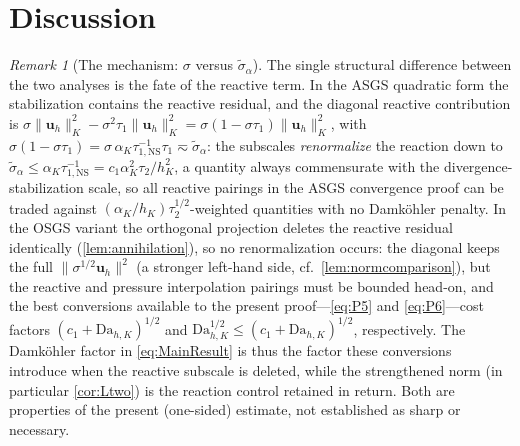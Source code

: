 \documentclass[11pt]{article}
\theoremstyle{remark}
\newtheorem{remark}[theorem]{Remark}
\newcommand{\bu}{\boldsymbol{u}}
\newcommand{\norm}[1]{\lVert #1 \rVert}
\newcommand{\tns}{\tau_{1,\mathrm{NS}}}
\newcommand{\Dah}{\mathrm{Da}_{h,K}}
\begin{document}
\section{Discussion}
\label{sec:discussion}

\begin{remark}[The mechanism: $\sigma$ versus $\widetilde{\sigma}_\alpha$]
\label{rem:mechanism}
The single structural difference between the two analyses is the fate of the reactive
term. In the ASGS quadratic form the stabilization contains the reactive residual, and
the diagonal reactive contribution is
$\sigma\norm{\bu_h}_K^2 - \sigma^2\tau_{1}\norm{\bu_h}_K^2
= \sigma(1-\sigma\tau_1)\norm{\bu_h}_K^2$, with
$\sigma(1-\sigma\tau_1) = \sigma\,\alpha_K\tns^{-1}\tau_1 \eqsim
\widetilde{\sigma}_\alpha$: the subscales \emph{renormalize} the reaction down to
$\widetilde{\sigma}_\alpha \le \alpha_K\tns^{-1} = c_1\alpha_K^2\tau_2/h_K^2$, a
quantity always commensurate with the divergence-stabilization scale, so all reactive
pairings in the ASGS convergence proof can be traded against
$(\alpha_K/h_K)\tau_2^{1/2}$-weighted quantities with no Damk\"ohler penalty. In the
OSGS variant the orthogonal projection deletes the reactive residual identically
(\cref{lem:annihilation}), so no renormalization occurs: the diagonal keeps the full
$\norm{\sigma^{1/2}\bu_h}^2$ (a stronger left-hand side, cf.\
\cref{lem:normcomparison}), but the reactive and pressure interpolation pairings must
be bounded head-on, and the best conversions available to the present proof---\cref{eq:P5}
and \cref{eq:P6}---cost factors $(c_1+\Dah)^{1/2}$ and $\Dah^{1/2}\le(c_1+\Dah)^{1/2}$, respectively. The Damk\"ohler factor in
\cref{eq:MainResult} is thus the factor these conversions introduce when the reactive
subscale is deleted, while the strengthened norm (in particular \cref{cor:Ltwo}) is the
reaction control retained in return. Both are properties of the present (one-sided)
estimate, not established as sharp or necessary.
\end{remark}
\end{document}
